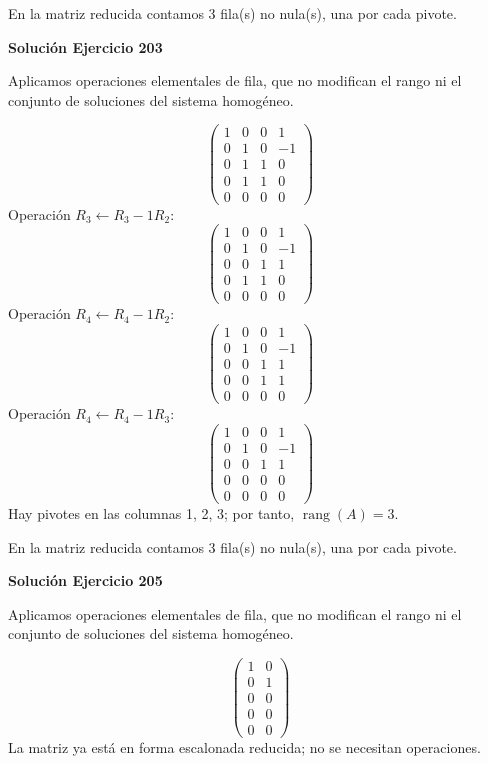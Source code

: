 \documentclass[12pt]{article}
\newcommand{\rang}{\operatorname{rang}}
\begin{document}
En la matriz reducida contamos 3 fila(s) no nula(s), una por cada pivote.


\par\bigskip\noindent\textbf{Solución Ejercicio 203}\par\nobreak
Aplicamos operaciones elementales de fila, que no modifican el rango ni el conjunto de soluciones del sistema homogéneo.

\[
\begin{pmatrix}1&0&0&1\\0&1&0&-1\\0&1&1&0\\0&1&1&0\\0&0&0&0\end{pmatrix}
\]
Operación $R_{3}\leftarrow R_{3}-1R_{2}$:
\[
\begin{pmatrix}1&0&0&1\\0&1&0&-1\\0&0&1&1\\0&1&1&0\\0&0&0&0\end{pmatrix}
\]
Operación $R_{4}\leftarrow R_{4}-1R_{2}$:
\[
\begin{pmatrix}1&0&0&1\\0&1&0&-1\\0&0&1&1\\0&0&1&1\\0&0&0&0\end{pmatrix}
\]
Operación $R_{4}\leftarrow R_{4}-1R_{3}$:
\[
\begin{pmatrix}1&0&0&1\\0&1&0&-1\\0&0&1&1\\0&0&0&0\\0&0&0&0\end{pmatrix}
\]
Hay pivotes en las columnas 1, 2, 3; por tanto, $\boxed{\rang(A)=3}$.

En la matriz reducida contamos 3 fila(s) no nula(s), una por cada pivote.


\par\bigskip\noindent\textbf{Solución Ejercicio 205}\par\nobreak
Aplicamos operaciones elementales de fila, que no modifican el rango ni el conjunto de soluciones del sistema homogéneo.

\[
\begin{pmatrix}1&0\\0&1\\0&0\\0&0\\0&0\end{pmatrix}
\]
La matriz ya está en forma escalonada reducida; no se necesitan operaciones.
\end{document}
